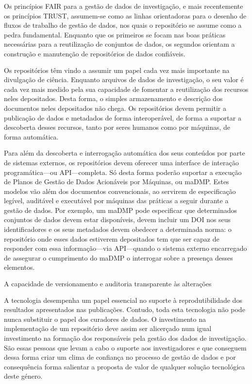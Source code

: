 \documentclass[sigconf,nonacm]{acmart}
\begin{document}
Os princípios FAIR para a gestão de dados de investigação, e mais recentemente os princípios TRUST, assumem-se como as linhas orientadoras para o desenho de fluxos de trabalho de gestão de dados, nos quais o repositório se assume como a pedra fundamental. Enquanto que os primeiros se focam nas boas práticas necessárias para a reutilização de conjuntos de dados, os segundos orientam a construção e manutenção de repositórios de dados confiáveis.

Os repositórios têm vindo a assumir um papel cada vez mais importante na divulgação de ciência. Enquanto arquivos de dados de investigação, o seu valor é cada vez mais medido pela sua capacidade de fomentar a reutilização dos recursos neles depositados. Desta forma, o simples armazenamento e descrição dos documentos neles depositados não chega. Os repositórios devem permitir a publicação de dados e metadados de forma interoperável, de forma a suportar a descoberta desses recursos, tanto por seres humanos como por máquinas, de forma automática.

Para além da descoberta e interrogação automática dos seus conteúdos por parte de sistemas externos, os repositórios devem oferecer uma interface de interação programática---ou API---completa. Só desta forma poderão suportar a execução de Planos de Gestão de Dados Acionáveis por Máquinas, ou maDMP. Estes modelos vão além dos documentos convencionais, ao servirem de especificação legível, auditável e executável por máquinas das práticas a seguir durante a gestão de dados. Por exemplo, um maDMP pode especificar que determinados conjuntos de dados devem estar disponíveis, devem incluir um DOI nos seus identificadores e os seus metadados devem obedecer a determinada norma: o repositório onde esses dados estiverem depositados tem que ser capaz de responder com essa informação---via API---quando o sistema externo encarregado de assegurar o cumprimento do maDMP o interrogar sobre a presença desses elementos.


A capacidade de versionamento e auditoria transparente às alterações 

A tecnologia desempenha um papel essencial no suporte à reprodutibilidade dos resultados apresentados nas publicações. Contudo, toda esta tecnologia não pode nunca substituir o papel dos curadores de dados. O investimento na implementação de um repositório deve assim ser alicerçado num igual investimento na formação dos responsáveis pela gestão dos dados de investigação. São essas pessoas que levam a cabo o suporte aos investigadores e que conseguem dessa forma criar um clima de confiança no processo de gestão de dados e por consequência forma salientar a proposta de valor de qualquer solução tecnológica deste género.
\end{document}
